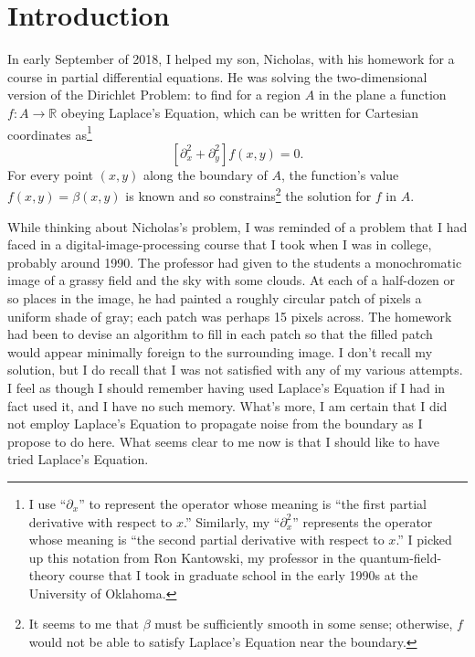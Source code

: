 \documentclass{article}
\newcommand{\R}{\ensuremath{\mathbb{R}}}
\begin{document}
\section{Introduction}

In early September of 2018, I helped my son, Nicholas, with his homework for a
course in partial differential equations.  He was solving the two-dimensional
version of the Dirichlet Problem: to find for a region $A$ in the plane a
function $f: A \rightarrow \R$ obeying Laplace's Equation, which can be written
for Cartesian coordinates as\footnote{%
   I use ``$\partial_x$'' to represent the operator whose meaning is ``the
   first partial derivative with respect to $x$.'' Similarly, my
   ``$\partial_x^2$'' represents the operator whose meaning is ``the second
   partial derivative with respect to $x$.'' I picked up this notation from Ron
   Kantowski, my professor in the quantum-field-theory course that I took in
   graduate school in the early 1990s at the University of Oklahoma.}
\begin{equation}
   \left[\partial_x^2 + \partial_y^2\right] f(x,y) = 0.
\end{equation}
For every point $(x,y)$ along the boundary of $A$, the function's value $f(x,y)
= \beta(x,y)$ is known and so constrains\footnote{%
   It seems to me that $\beta$ must be sufficiently smooth in some sense;
   otherwise, $f$ would not be able to satisfy Laplace's Equation near the
   boundary.}
the solution for $f$ in $A$.

While thinking about Nicholas's problem, I was reminded of a problem that I had
faced in a digital-image-processing course that I took when I was in college,
probably around 1990.  The professor had given to the students a monochromatic
image of a grassy field and the sky with some clouds.  At each of a half-dozen
or so places in the image, he had painted a roughly circular patch of pixels a
uniform shade of gray; each patch was perhaps 15 pixels across.  The homework
had been to devise an algorithm to fill in each patch so that the filled patch
would appear minimally foreign to the surrounding image.  I don't recall my
solution, but I do recall that I was not satisfied with any of my various
attempts.  I feel as though I should remember having used Laplace's Equation if
I had in fact used it, and I have no such memory.  What's more, I am certain
that I did not employ Laplace's Equation to propagate noise from the boundary
as I propose to do here.  What seems clear to me now is that I should like to
have tried Laplace's Equation.
\end{document}
